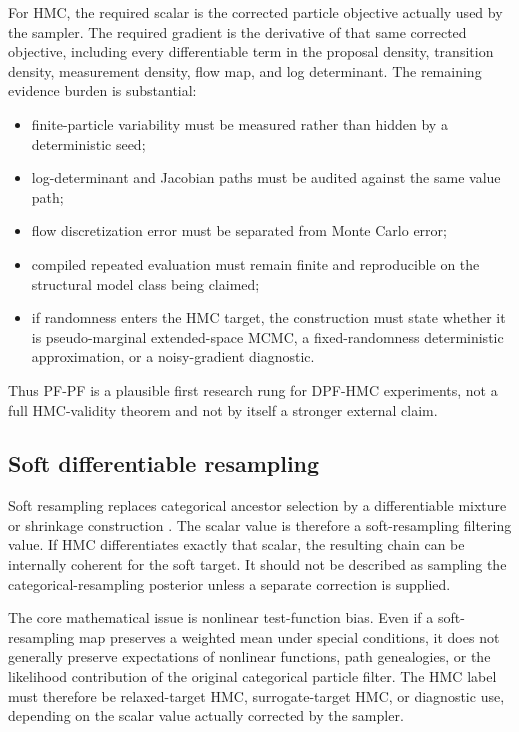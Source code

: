 For HMC, the required scalar is the corrected particle objective actually used
by the sampler.  The required gradient is the derivative of that same corrected
objective, including every differentiable term in the proposal density,
transition density, measurement density, flow map, and log determinant.  The
remaining evidence burden is substantial:
\begin{itemize}
  \item finite-particle variability must be measured rather than hidden by a
    deterministic seed;
  \item log-determinant and Jacobian paths must be audited against the same
    value path;
  \item flow discretization error must be separated from Monte Carlo error;
  \item compiled repeated evaluation must remain finite and reproducible on the
    structural model class being claimed;
  \item if randomness enters the HMC target, the construction must state
    whether it is pseudo-marginal extended-space MCMC, a fixed-randomness
    deterministic approximation, or a noisy-gradient diagnostic.
\end{itemize}
Thus PF-PF is a plausible first research rung for DPF-HMC experiments, not a
full HMC-validity theorem and not by itself a stronger external claim.

\subsection{Soft differentiable resampling}

Soft resampling replaces categorical ancestor selection by a differentiable
mixture or shrinkage construction \citep{zhumurphyjonschkowski2020,jonschkowski2018differentiable,karkus2018particle}.  The scalar value is therefore a
soft-resampling filtering value.  If HMC differentiates exactly that scalar, the
resulting chain can be internally coherent for the soft target.  It should not
be described as sampling the categorical-resampling posterior unless a separate
correction is supplied.

The core mathematical issue is nonlinear test-function bias.  Even if a
soft-resampling map preserves a weighted mean under special conditions, it does
not generally preserve expectations of nonlinear functions, path genealogies,
or the likelihood contribution of the original categorical particle filter.
The HMC label must therefore be relaxed-target HMC, surrogate-target HMC, or
diagnostic use, depending on the scalar value actually corrected by the
sampler.

